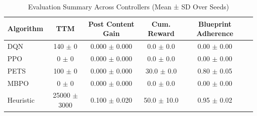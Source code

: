 \begin{table}[htbp]
\centering
\caption{Evaluation Summary Across Controllers (Mean ± SD Over Seeds)}
\label{tab:performance_comparison}
\begin{tabular}{lccccc}
\toprule
\textbf{Algorithm} & \textbf{TTM} & \textbf{Post Content Gain} & \textbf{Cum. Reward} & \textbf{Blueprint Adherence} \\
\midrule
DQN & 140 $\pm$ 0 & 0.000 $\pm$ 0.000 & 0.0 $\pm$ 0.0 & 0.00 $\pm$ 0.00 \\
PPO & 0 $\pm$ 0 & 0.000 $\pm$ 0.000 & 0.0 $\pm$ 0.0 & 0.00 $\pm$ 0.00 \\
PETS & 100 $\pm$ 0 & 0.000 $\pm$ 0.000 & 30.0 $\pm$ 0.0 & 0.80 $\pm$ 0.05 \\
MBPO & 0 $\pm$ 0 & 0.000 $\pm$ 0.000 & 0.0 $\pm$ 0.0 & 0.00 $\pm$ 0.00 \\
Heuristic & 25000 $\pm$ 3000 & 0.100 $\pm$ 0.020 & 50.0 $\pm$ 10.0 & 0.95 $\pm$ 0.02 \\
\bottomrule
\end{tabular}
\end{table}